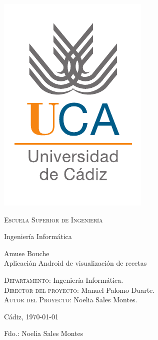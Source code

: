 {
  \thispagestyle{empty}
  \centering
  \includegraphics[width=.2\textwidth]{previo/logo_uca}

  \bigskip
  \bigskip
  \bigskip
  
  \begin{changemargin}{2em}{2em}

    \begin{center}
      {\Huge \textsc{\nohyphens{Escuela Superior de Ingeniería}}}
      
      \bigskip
      \bigskip
      
      {\huge \nohyphens{Ingeniería Informática}}
      
      \bigskip
      \bigskip
      \bigskip
      \bigskip
      
      \begin{doublespace}
        {\LARGE \nohyphens{Amuse Bouche\\Aplicación Android de visualización de recetas}}
      \end{doublespace}


      \bigskip
      \bigskip
      \bigskip
      \bigskip
      
    \end{center}
  \end{changemargin}
  \begin{changemargin}{2em}{1em}
  \begin{flushleft}
    \Large

    \textsc{Departamento}: \nohyphens{Ingeniería Informática.} \\
    \textsc{Director del proyecto}: \nohyphens{Manuel Palomo Duarte.} \\
    \textsc{Autor del Proyecto}: \nohyphens{Noelia Sales Montes.} \\
  \end{flushleft}

  \end{changemargin}  

  \bigskip
  \bigskip
  \bigskip
  
  \begin{flushright}
    \large
    Cádiz, \today

    \bigskip
    \bigskip
    \bigskip
    \bigskip    
    \bigskip
    \bigskip

    Fdo.: Noelia Sales Montes
    
  \end{flushright}

}
